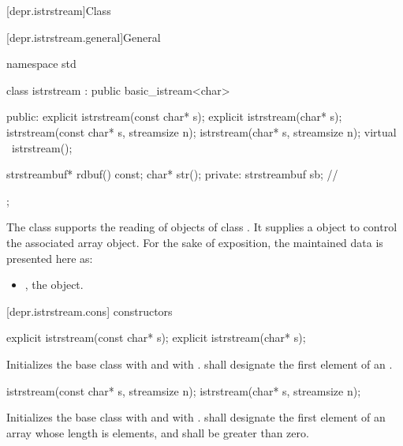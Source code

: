 [depr.istrstream]{Class }

[depr.istrstream.general]{General}

%
\begin{codeblock}
namespace std {
  class istrstream : public basic_istream<char> {
  public:
    explicit istrstream(const char* s);
    explicit istrstream(char* s);
    istrstream(const char* s, streamsize n);
    istrstream(char* s, streamsize n);
    virtual ~istrstream();

    strstreambuf* rdbuf() const;
    char* str();
  private:
    strstreambuf sb;            // \expos
  };
}
\end{codeblock}

\pnum
The class
supports the reading of objects of class
.
It supplies a
object to control the associated array object.
For the sake of exposition, the maintained data is presented here as:

\begin{itemize}
\item
{}, the  object.
\end{itemize}

[depr.istrstream.cons]{ constructors}

%
\begin{itemdecl}
explicit istrstream(const char* s);
explicit istrstream(char* s);
\end{itemdecl}

\begin{itemdescr}
\pnum
\effects
Initializes the base class with  and
 with .
 shall designate the first element of an \ntbs{}.%
\end{itemdescr}

%
\begin{itemdecl}
istrstream(const char* s, streamsize n);
istrstream(char* s, streamsize n);
\end{itemdecl}

\begin{itemdescr}
\pnum
\effects
Initializes the base class with 
and  with .
 shall designate the first element of an array whose length is
 elements, and  shall be greater than zero.
\end{itemdescr}

